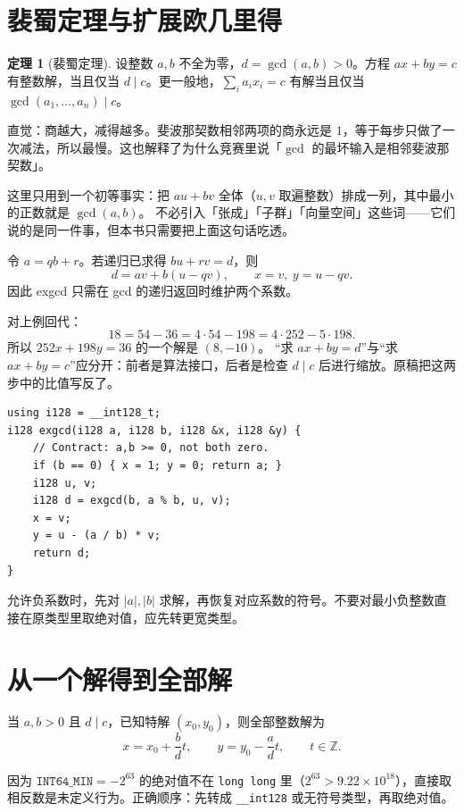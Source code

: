 \documentclass[UTF8,a4paper,11pt,twoside,openright,fontset=fandol]{ctexbook}
\theoremstyle{definition}
\newtheorem{theorem}[definition]{定理}
\newcommand{\Z}{\mathbb Z}
\begin{document}
\section{裴蜀定理与扩展欧几里得}
\begin{theorem}[裴蜀定理]
设整数 $a,b$ 不全为零，$d=\gcd(a,b)>0$。方程 $ax+by=c$ 有整数解，当且仅当 $d\mid c$。更一般地，$\sum_i a_ix_i=c$ 有解当且仅当 $\gcd(a_1,\ldots,a_n)\mid c$。
\end{theorem}
\begin{tip}
直觉：商越大，减得越多。斐波那契数相邻两项的商永远是 $1$，等于每步只做了一次减法，所以最慢。这也解释了为什么竞赛里说「$\gcd$ 的最坏输入是相邻斐波那契数」。
\end{tip}

这里只用到一个初等事实：把 $au+bv$ 全体（$u,v$ 取遍整数）排成一列，其中最小的正数就是 $\gcd(a,b)$。
不必引入「张成」「子群」「向量空间」这些词——它们说的是同一件事，但本书只需要把上面这句话吃透。

令 $a=qb+r$。若递归已求得 $bu+rv=d$，则
\[
 d=av+b(u-qv),\qquad x=v,\ y=u-qv.
\]
因此 exgcd 只需在 gcd 的递归返回时维护两个系数。


对上例回代：
\[
18=54-36=4\cdot54-198=4\cdot252-5\cdot198.
\]
所以 $252x+198y=36$ 的一个解是 $(8,-10)$。
“求 $ax+by=d$”与“求 $ax+by=c$”应分开：前者是算法接口，后者是检查 $d\mid c$ 后进行缩放。原稿把这两步中的比值写反了。
\begin{lstlisting}
using i128 = __int128_t;
i128 exgcd(i128 a, i128 b, i128 &x, i128 &y) {
    // Contract: a,b >= 0, not both zero.
    if (b == 0) { x = 1; y = 0; return a; }
    i128 u, v;
    i128 d = exgcd(b, a % b, u, v);
    x = v;
    y = u - (a / b) * v;
    return d;
}
\end{lstlisting}
允许负系数时，先对 $|a|,|b|$ 求解，再恢复对应系数的符号。不要对最小负整数直接在原类型里取绝对值，应先转更宽类型。


\section{从一个解得到全部解}
当 $a,b>0$ 且 $d\mid c$，已知特解 $(x_0,y_0)$，则全部整数解为
\[
 x=x_0+\frac bd t,\qquad y=y_0-\frac ad t,\qquad t\in\Z.
\]

\begin{tip}
因为 $\texttt{INT64\_MIN}=-2^{63}$ 的绝对值不在 \texttt{long long} 里（$2^{63}>9.22\times10^{18}$），直接取相反数是未定义行为。正确顺序：先转成 \texttt{\_\_int128} 或无符号类型，再取绝对值。
\end{tip}
\end{document}
